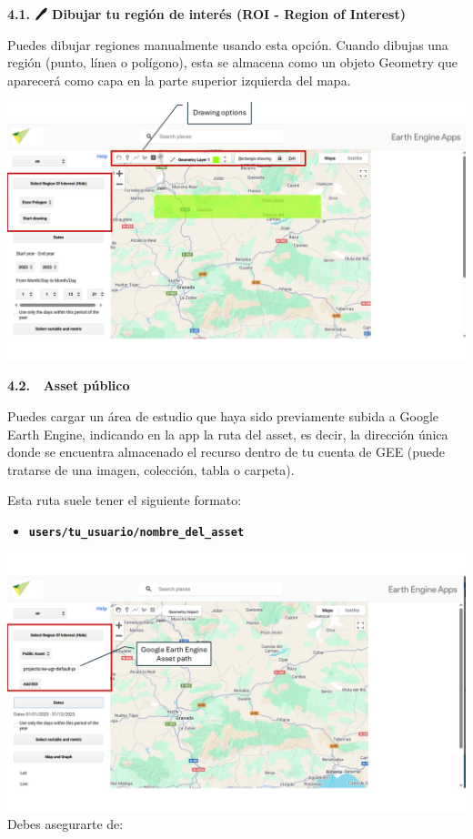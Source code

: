\documentclass[
]{book}
\providecommand{\tightlist}{%
  \setlength{\itemsep}{0pt}\setlength{\parskip}{0pt}}
\begin{document}
\textbf{4.1. 🖊️ Dibujar tu región de interés (ROI - Region of Interest)}

Puedes dibujar regiones manualmente usando esta opción. Cuando dibujas una región (punto, línea o polígono), esta se almacena como un objeto Geometry que aparecerá como capa en la parte superior izquierda del mapa.

\includegraphics{assets/Drawing.png}

\textbf{4.2. 📂 Asset público}

Puedes cargar un área de estudio que haya sido previamente subida a Google Earth Engine, indicando en la app la ruta del asset, es decir, la dirección única donde se encuentra almacenado el recurso dentro de tu cuenta de GEE (puede tratarse de una imagen, colección, tabla o carpeta).

Esta ruta suele tener el siguiente formato:

\begin{itemize}
\tightlist
\item
  \textbf{\texttt{users/tu\_usuario/nombre\_del\_asset}}
\end{itemize}

\includegraphics{assets/asset.png}
Debes asegurarte de:
\end{document}
